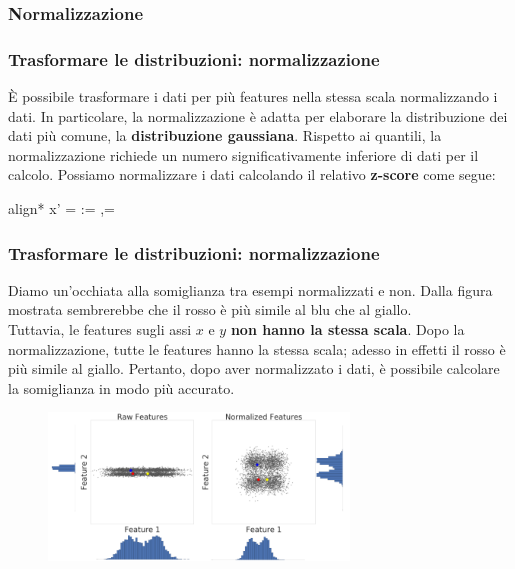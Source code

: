 \subsubsection[Normalizzazione]{Normalizzazione}
\begin{frame}
	
	\frametitle{{\color{GradientDescentDiagramOrange}Trasformare le distribuzioni}: {\color{GradientDescentDiagramBlue}normalizzazione}}
	
		È possibile trasformare i dati per più features nella stessa scala normalizzando i dati.
		In particolare, la normalizzazione è adatta per elaborare la distribuzione dei dati più comune, la \textbf{distribuzione gaussiana}.
		Rispetto ai quantili, la normalizzazione richiede un numero significativamente inferiore di dati per il calcolo.
		\newlinedouble
		Possiamo normalizzare i dati calcolando il relativo \textbf{z-score} come segue:
		\begin{empheq}[box=\fcolorbox{blue!40!black!60}{yellow!10}]{align*}
		x' =  \quad:\quad\mu = ,\text{ }\sigma = 
		\end{empheq}
		
	
\end{frame}


\begin{frame}
	
	\frametitle{{\color{GradientDescentDiagramOrange}Trasformare le distribuzioni}: {\color{GradientDescentDiagramBlue}normalizzazione}}
	
		Diamo un'occhiata alla somiglianza tra esempi normalizzati e non.	 Dalla figura mostrata sembrerebbe che il rosso è più simile al blu che al giallo.\\
		Tuttavia, le features sugli assi $x$ e $y$ \textbf{non hanno la stessa scala}.
		\newlinedouble
		Dopo la normalizzazione, tutte le features hanno la stessa scala; adesso in effetti il rosso è più simile al giallo. Pertanto, dopo aver normalizzato i dati, è possibile calcolare la somiglianza in modo più accurato.
		
		\begin{figure}[!htbp]
			\centering
			\includegraphics[width=8.0cm]{images/data_prep/scaling_distributions/NormalizeData.png}
		\end{figure}
		
	
\end{frame}


